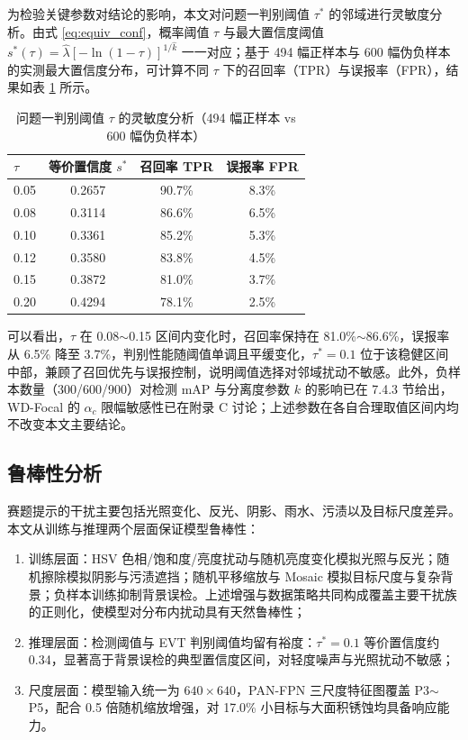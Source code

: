 为检验关键参数对结论的影响，本文对问题一判别阈值 $\tau^{*}$ 的邻域进行灵敏度分析。由式 \eqref{eq:equiv_conf}，概率阈值 $\tau$ 与最大置信度阈值 $s^{*}(\tau)=\hat{\lambda}[-\ln(1-\tau)]^{1/\hat{k}}$ 一一对应；基于 494 幅正样本与 600 幅伪负样本的实测最大置信度分布，可计算不同 $\tau$ 下的召回率（TPR）与误报率（FPR），结果如表 \ref{tab:sensitivity} 所示。

\begin{table}[H]
\centering
{}
\caption{问题一判别阈值 $\tau$ 的灵敏度分析（494 幅正样本 vs 600 幅伪负样本）}\label{tab:sensitivity}
\begin{tabular}{lccc}
  \toprule
  $\tau$ & 等价置信度 $s^{*}$ & 召回率 TPR & 误报率 FPR \\
  \midrule
  0.05 & 0.2657 & 90.7\% & 8.3\% \\
  0.08 & 0.3114 & 86.6\% & 6.5\% \\
  0.10 & 0.3361 & 85.2\% & 5.3\% \\
  0.12 & 0.3580 & 83.8\% & 4.5\% \\
  0.15 & 0.3872 & 81.0\% & 3.7\% \\
  0.20 & 0.4294 & 78.1\% & 2.5\% \\
  \bottomrule
\end{tabular}
\end{table}

可以看出，$\tau$ 在 0.08$\sim$0.15 区间内变化时，召回率保持在 81.0\%$\sim$86.6\%，误报率从 6.5\% 降至 3.7\%，判别性能随阈值单调且平缓变化，$\tau^{*}=0.1$ 位于该稳健区间中部，兼顾了召回优先与误报控制，说明阈值选择对邻域扰动不敏感。此外，负样本数量（300/600/900）对检测 mAP 与分离度参数 $k$ 的影响已在 7.4.3 节给出，WD-Focal 的 $\alpha_c$ 限幅敏感性已在附录 C 讨论；上述参数在各自合理取值区间内均不改变本文主要结论。
\subsection{鲁棒性分析}

赛题提示的干扰主要包括光照变化、反光、阴影、雨水、污渍以及目标尺度差异。本文从训练与推理两个层面保证模型鲁棒性：

\begin{enumerate}[leftmargin=2.2em,itemsep=2pt]
  \item {\heiti 训练层面：}HSV 色相/饱和度/亮度扰动与随机亮度变化模拟光照与反光；随机擦除模拟阴影与污渍遮挡；随机平移缩放与 Mosaic 模拟目标尺度与复杂背景；负样本训练抑制背景误检。上述增强与数据策略共同构成覆盖主要干扰族的正则化，使模型对分布内扰动具有天然鲁棒性；
  \item {\heiti 推理层面：}检测阈值与 EVT 判别阈值均留有裕度：$\tau^{*}=0.1$ 等价置信度约 0.34，显著高于背景误检的典型置信度区间，对轻度噪声与光照扰动不敏感；
  \item {\heiti 尺度层面：}模型输入统一为 $640\times640$，PAN-FPN 三尺度特征图覆盖 P3$\sim$P5，配合 0.5 倍随机缩放增强，对 17.0\% 小目标与大面积锈蚀均具备响应能力。
\end{enumerate}

